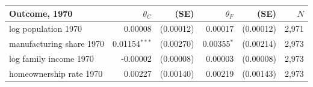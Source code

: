 \begin{tabular}{lrrrrr}
\toprule
Outcome, 1970 & $\theta_C$ & (SE) & $\theta_F$ & (SE) & $N$ \\
\midrule
log population 1970 & 0.00008 & (0.00012) & 0.00017 & (0.00012) & 2,971 \\
manufacturing share 1970 & 0.01154$^{***}$ & (0.00270) & 0.00355$^{*}$ & (0.00214) & 2,973 \\
log family income 1970 & -0.00002 & (0.00008) & 0.00003 & (0.00008) & 2,973 \\
homeownership rate 1970 & 0.00227 & (0.00140) & 0.00219 & (0.00143) & 2,973 \\
\bottomrule
\end{tabular}